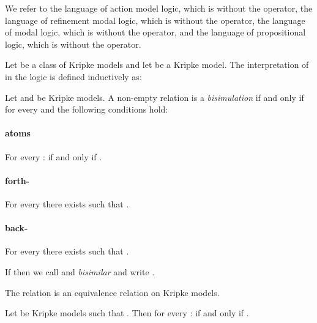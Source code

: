 \documentclass[twoside]{aiml14}
\begin{document}
  We refer to the language \langAml{} of action model logic, which is \langAaml{} without the  operator,
  the language \langRml{} of refinement modal logic, which is \langAaml{} without the  operator,
  the language \lang{} of modal logic, which is \langAml{} without the  operator, 
  and the language \langP{} of propositional logic, which is \lang{} without the  operator.

  \begin{definition}\label{ml-semantics}
  Let \classC{} be a class of Kripke models and let  be a Kripke model.
  The interpretation of  in the logic \logicC{} is defined 
  inductively as:
  
  \end{definition}

  \begin{definition}
      Let  
      and 
      be Kripke models. 
      A non-empty relation 
      is a {\em bisimulation} if and only if for every  
      and  the following conditions hold:

      \paragraph{atoms}
      For every :  if and only if .

      \paragraph{forth-}
      For every  
      there exists 
      such that .

      \paragraph{back-}
      For every 
      there exists  
      such that .

      If  then we call
       and 
      {\em bisimilar} and write 
      .
  \end{definition}

  \begin{proposition}
      The relation  is an equivalence relation on Kripke models.
  \end{proposition}

  \begin{proposition}
      Let  be Kripke models such that
      . 
      Then for every :
       if and only if .
  \end{proposition}
\end{document}
